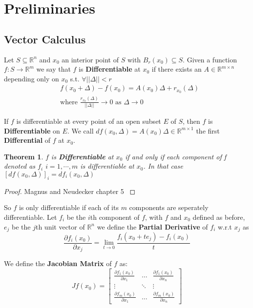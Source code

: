 \documentclass[]{article}
\theoremstyle{mattstyle}
\newtheorem{theorem}{Theorem}[section]
\theoremstyle{definition}
\begin{document}
\newpage

\section{Preliminaries}

\subsection{Vector Calculus}

Let $S \subseteq \mathbb{R}^n$ and $x_0$ an interior point of $S$ with $B_r(x_0) \subseteq S$. Given a function $f: S \rightarrow \mathbb{R}^m$ we say that $f$ is \textbf{Differentiable} at $x_0$ if there exists an $A \in \mathbb{R}^{m \times n}$ depending only on $x_0$ s.t. $\forall ||\Delta|| < r$
\begin{align*}
&f(x_0 + \Delta) - f(x_0) = A(x_0)\Delta + r_{x_0}(\Delta)\\
&\text{where $\frac{r_{x_0}(\Delta)}{||\Delta||}\rightarrow 0$ as $\Delta \rightarrow 0$}
\end{align*}


If $f$ is differentiable at every point of an open subset $E$ of $S$, then $f$ is \textbf{Differentiable} on $E$. We call $df(x_0, \Delta) = A(x_0)\Delta \in \mathbb{R}^{m \times 1}$ the first \textbf{Differential} of $f$ at $x_0$.

\begin{theorem}
	$f$ is \textbf{Differentiable} at $x_0$ if and only if each component of f denoted as $f_i$ $i=1,\cdots, m$ is differentiable at $x_0$. In that case $[df(x_0, \Delta)]_i = df_i(x_0, \Delta)$
\end{theorem}
\begin{proof}
	Magnus and Neudecker chapter 5 \cite{magnus1988matrix}
\end{proof}

So $f$ is only differentiable if each of its $m$ components are seperately differentiable. Let $f_i$ be the $i$th component of $f$, with $f$ and $x_0$ defined as before, $e_j$ be the $j$th unit vector of $\mathbb{R}^n$ we define the \textbf{Partial Derivative} of $f_i$ w.r.t $x_j$ as
$$
\frac{\partial f_i(x_0)}{\partial x_j} = \lim\limits_{t \rightarrow 0} \frac{f_i(x_0+te_j) - f_i(x_0)}{t}
$$

We define the \textbf{Jacobian Matrix} of $f$ as:
$$ Jf(x_0) =  \begin{bmatrix}
\frac{\partial f_1(x_0)}{\partial x_1} & \dots  & \frac{\partial f_1(x_0)}{\partial x_n} \\
\vdots & \ddots & \vdots \\
\frac{\partial f_m(x_0)}{\partial x_1} & \dots  & \frac{\partial f_m(x_0)}{\partial x_n}
\end{bmatrix}$$
\end{document}
